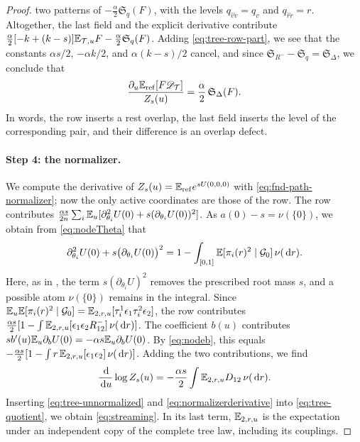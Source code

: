 \begin{proof}
two patterns of $-\frac\alpha2\mathfrak S_q(F)$, with the levels
$q_{\hat v\check v}=q_v$ and $q_{\hat r\check r}=r$. Altogether, the last
field and the explicit derivative contribute
$\frac\alpha2[-k+(k-s)]\mathbb E_{\mathcal T,u}F-\frac\alpha2\mathfrak S_q(F)$.
Adding \eqref{eq:tree-row-part}, we see that the constants $\alpha s/2$,
$-\alpha k/2$, and $\alpha(k-s)/2$ cancel, and since
$\mathfrak S_{R^-}-\mathfrak S_q=\mathfrak S_\Delta$, we conclude that
\begin{equation}\label{eq:tree-unnormalized}
 \frac{\partial_u\mathbb E_{\rm ref}[F\mathscr D_{\mathcal T}]}{Z_s(u)}
 =\frac\alpha2\,\mathfrak S_\Delta(F).
\end{equation}
In words, the row inserts a rest overlap, the last field inserts the
level of the corresponding pair, and their difference is an overlap
defect.

\paragraph{Step 4: the normalizer.}
We compute the derivative of $Z_s(u)=\mathbb E_{\rm ref}e^{sU(0,0,0)}$ with
\eqref{eq:fnd-path-normalizer}; now the only active coordinates are those of the
row. The row contributes
$\frac{\alpha s}{2n}\sum_i\mathbb E_u[\partial_{\theta_i}^2U(0)
+s(\partial_{\theta_i}U(0))^2]$. As $a(0)-s=\nu(\{0\})$, we obtain from
\eqref{eq:nodeTheta} that
\[
 \partial_{\theta_i}^2U(0)+s\bigl(\partial_{\theta_i}U(0)\bigr)^2
 =1-\int_{[0,1]}\mathbb E[\pi_i(r)^2\mid\mathcal G_0]\,\nu(\,\mathrm d r).
\]
Here, as in \cite[(2.11)]{AL}, the term $s(\partial_{\theta_i}U)^2$
removes the prescribed root mass $s$, and a possible atom $\nu(\{0\})$
remains in the integral. Since
$\mathbb E_u\mathbb E[\pi_i(r)^2\mid\mathcal G_0]=\mathbb E_{2,r,u}[\tau_i^1\epsilon_1\tau_i^2\epsilon_2]$,
the row contributes
$\frac{\alpha s}2[1-\int\mathbb E_{2,r,u}[\epsilon_1\epsilon_2R^-_{12}]\,
\nu(\,\mathrm d r)]$. The coefficient $b(u)$ contributes
$sb'(u)\mathbb E_u\partial_bU(0)=-\alpha s\mathbb E_u\partial_bU(0)$. By
\eqref{eq:nodeb}, this equals
$-\frac{\alpha s}2[1-\int r\,\mathbb E_{2,r,u}[\epsilon_1\epsilon_2]\,\nu(\,\mathrm d r)]$.
Adding the two contributions, we find
\begin{equation}\label{eq:normalizerderivative}
 \frac{\,\mathrm d}{\,\mathrm d u}\log Z_s(u)
 =-\frac{\alpha s}{2}\int\mathbb E_{2,r,u}D_{12}\,\nu(\,\mathrm d r).
\end{equation}
Inserting \eqref{eq:tree-unnormalized} and
\eqref{eq:normalizerderivative} into \eqref{eq:tree-quotient}, we obtain
\eqref{eq:streaming}. In its last term, $\mathbb E_{2,r,u}$ is the expectation
under an independent copy of the complete tree law, including its
couplings.


\end{proof}
